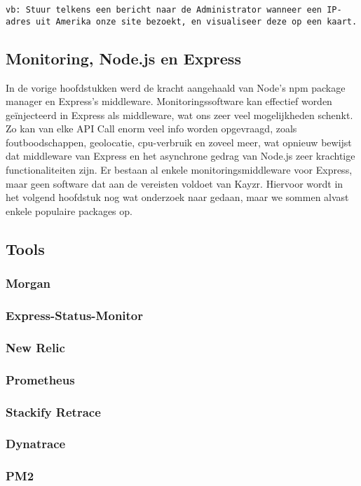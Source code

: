 \texttt{vb: Stuur telkens een bericht naar de Administrator wanneer een IP-adres uit Amerika onze site bezoekt, en visualiseer deze op een kaart.}

\subsection{Monitoring, Node.js en Express}
\label{sec:monitoringNodeExpress}

In de vorige hoofdstukken werd de kracht aangehaald van Node's npm package manager en Express's middleware. Monitoringssoftware kan effectief worden geïnjecteerd in Express als middleware, wat ons zeer veel mogelijkheden schenkt. Zo kan van elke API Call enorm veel info worden opgevraagd, zoals foutboodschappen, geolocatie, cpu-verbruik en zoveel meer, wat opnieuw bewijst dat middleware van Express en het asynchrone gedrag van Node.js zeer krachtige functionaliteiten zijn. Er bestaan al enkele monitoringsmiddleware voor Express, maar geen software dat aan de vereisten voldoet van Kayzr. Hiervoor wordt in het volgend hoofdstuk nog wat onderzoek naar gedaan, maar we sommen alvast enkele populaire packages op.

\subsection{Tools}
\label{sec:tools}

\subsubsection{Morgan}
\label{sec:morgan}

\subsubsection{Express-Status-Monitor}
\label{sec:statusMonitor}

\subsubsection{New Relic}
\label{sec:newRelic}

\subsubsection{Prometheus}
\label{sec:prometheus}

\subsubsection{Stackify Retrace}
\label{sec:retrace}

\subsubsection{Dynatrace}
\label{sec:dynatrace}

\subsubsection{PM2}
\label{sec:pm2}






 






 
